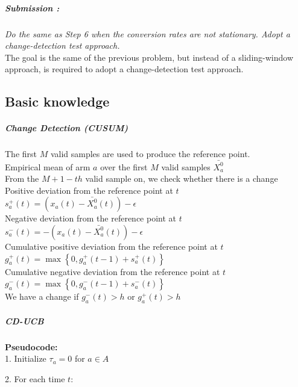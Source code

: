 \subparagraph*{Submission : }
\textit{Do the same as Step 6 when the conversion rates are not stationary. Adopt a change-detection test approach.}\\

The goal is the same of the previous problem, but instead of a sliding-window approach, is required to adopt a change-detection test approach.

\subsection*{Basic knowledge}
\subparagraph*{Change Detection (CUSUM)}
The first $M$ valid samples are used to produce the reference point.\\

Empirical mean of arm $a$ over the first $M$ valid samples $\bar{X_{a}^0}$\\

From the $M + 1-th$ valid sample on, we check whether there is a change\\

Positive deviation from the reference point at $t$ \hspace{0.2cm} $s_{a}^{+}(t) = (x_{a}(t) - \bar{X_{a}^0}(t)) - \epsilon$ \\

Negative deviation from the reference point at $t$ \hspace{0.2cm} $s_{a}^{-}(t) = -  (x_{a}(t) - \bar{X_{a}^0}(t)) - \epsilon$ \\

Cumulative positive deviation from the reference point at $t$ \hspace{0.2cm} $g_{a}^{+}(t) = \max \left\{0, g_{a}^{+}(t-1) + s_{a}^{+}(t) \right\}$ \\

Cumulative negative deviation from the reference point at $t$ \hspace{0.2cm} $g_{a}^{-}(t) = \max \left\{0, g_{a}^{-}(t-1) + s_{a}^{-}(t) \right\}$ \\

We have a change if \hspace{0.2cm} $g_{a}^{-}(t) > h$ or $g_{a}^{+}(t) > h$\\
\subparagraph*{CD-UCB}

\textbf{Pseudocode:}\\

1. Initialize $\tau_{a} = 0$ for $a\in A$ 

2. For each time $t$:\\

